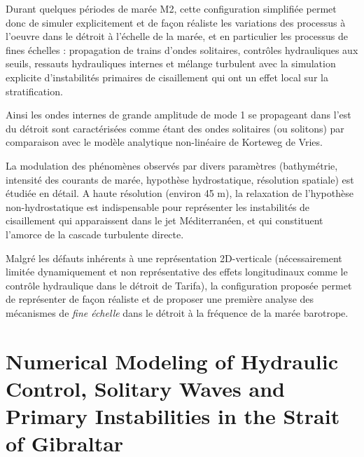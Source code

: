 Durant quelques périodes de marée M2, cette configuration simplifiée  permet donc de simuler explicitement et de façon réaliste les variations des processus à l'oeuvre dans le détroit à l'échelle de la marée, et en particulier les processus de fines échelles : propagation de trains d'ondes solitaires, contrôles hydrauliques aux seuils, ressauts hydrauliques internes et mélange turbulent avec la simulation explicite d'instabilités primaires de cisaillement qui ont un effet local sur la stratification. 

Ainsi les ondes internes de grande amplitude de mode 1 se propageant dans l'est du détroit sont caractérisées comme étant des ondes solitaires (ou solitons) par comparaison avec le modèle analytique non-linéaire de Korteweg de Vries. 

La modulation des phénomènes observés par divers paramètres (bathymétrie, intensité des courants de marée, hypothèse hydrostatique, résolution spatiale) est étudiée en détail. A haute résolution (environ 45 m), la relaxation de l'hypothèse non-hydrostatique est indispensable pour représenter les instabilités de cisaillement qui apparaissent dans le jet Méditerranéen, et qui constituent l'amorce de la cascade turbulente directe.

Malgré les défauts inhérents à une représentation 2D-verticale (nécessairement limitée dynamiquement et non représentative des effets longitudinaux comme le contrôle hydraulique dans le détroit de Tarifa), la configuration proposée permet de représenter de façon réaliste et de proposer une première analyse des mécanismes de \textit{fine échelle} dans le détroit à la fréquence de la marée barotrope.



\section{Numerical Modeling of Hydraulic Control, Solitary Waves and Primary Instabilities in the Strait of Gibraltar}
\label{sectionSim2D}

